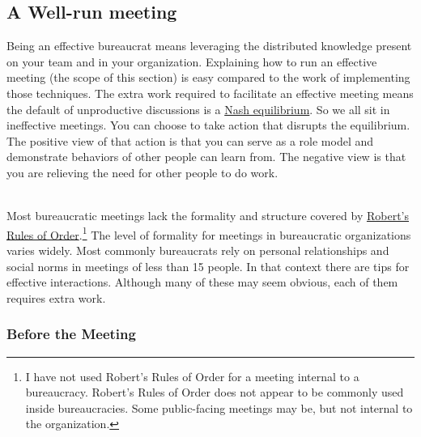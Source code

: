 \subsection*{A Well-run meeting\label{sec:well-run-meeting}}

Being an effective bureaucrat means leveraging the distributed knowledge present on your team and in your organization.
Explaining how to run an effective meeting (the scope of this section) is easy compared to the work of implementing those techniques. The extra work required to facilitate an effective meeting means the default of unproductive discussions is a \href{https://en.wikipedia.org/wiki/Nash_equilibrium}{Nash equilibrium}. 
\iftoggle{WPinmargin}{\marginpar{[Wikipedia] Nash \\ equilibrium}}{}
So we all sit in ineffective meetings. You can choose to take action that disrupts the equilibrium. The positive view of that action is that you can serve as a role model and demonstrate behaviors of other people can learn from. The negative view is that you are relieving the need for other people to do work.

\ \\

Most bureaucratic meetings lack the formality and structure  covered by \href{https://en.wikipedia.org/wiki/Robert\%27s_Rules_of_Order}{Robert's Rules of Order}.\footnote{I have not used Robert's Rules of Order for a meeting internal to a bureaucracy. Robert's Rules of Order does not appear to be commonly used inside bureaucracies. Some public-facing meetings may be, but not internal to the organization.} 
\iftoggle{WPinmargin}{\marginpar{[Wikipedia] Robert's \\Rules of Order}}{}
The level of formality for meetings in bureaucratic organizations varies widely. Most commonly bureaucrats rely on personal relationships and social norms in meetings of less than 15 people. In that context there are tips for effective interactions. Although many of these may seem obvious, each of them requires extra work. 


\subsubsection*{Before the Meeting}

